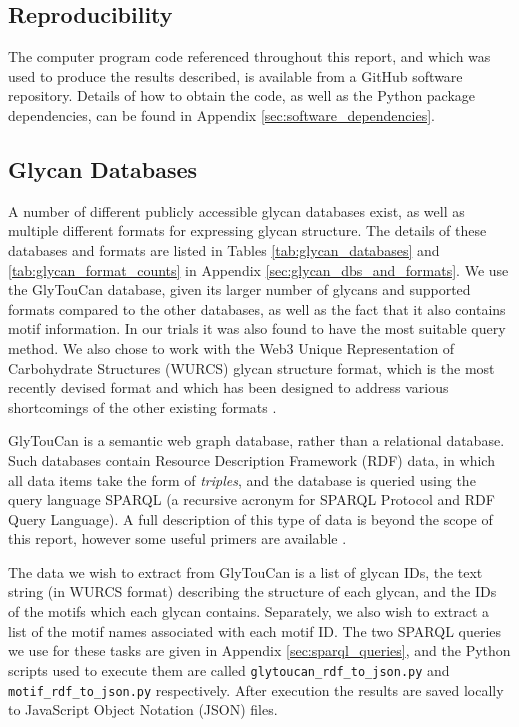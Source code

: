 \documentclass[12pt,a4paper]{article}
\begin{document}
\subsection{Reproducibility}
\label{sec:reproducibility}
The computer program code referenced throughout this report, and which was used to produce the results described, is available from a GitHub software repository. Details of how to obtain the code, as well as the Python package dependencies, can be found in Appendix \ref{sec:software_dependencies}. 

\subsection{Glycan Databases}
\label{sec:glycan_databases}

A number of different publicly accessible glycan databases exist, as well as multiple different formats for expressing glycan structure. The details of these databases and formats are listed in Tables \ref{tab:glycan_databases} and \ref{tab:glycan_format_counts} in Appendix \ref{sec:glycan_dbs_and_formats}. We use the GlyTouCan database, given its larger number of glycans and supported formats compared to the other databases, as well as the fact that it also contains motif information. In our trials it was also found to have the most suitable query method. We also chose to work with the Web3 Unique Representation of Carbohydrate Structures (WURCS) glycan structure format, which is the most recently devised format and which has been designed to address various shortcomings of the other existing formats \citep{matsubara2017wurcs}.

GlyTouCan is a semantic web graph database, rather than a relational database. Such databases contain Resource Description Framework (RDF) data, in which all data items take the form of \emph{triples}, and the database is queried using the query language SPARQL (a recursive acronym for SPARQL Protocol and RDF Query Language). A full description of this type of data is beyond the scope of this report, however some useful primers are available \citep{rdf_primer, sparql_overview}.

The data we wish to extract from GlyTouCan is a list of glycan IDs, the text string (in WURCS format) describing the structure of each glycan, and the IDs of the motifs which each glycan contains. Separately, we also wish to extract a list of the motif names associated with each motif ID. The two SPARQL queries we use for these tasks are given in Appendix \ref{sec:sparql_queries}, and the Python scripts used to execute them are called \texttt{glytoucan\_rdf\_to\_json.py} and \texttt{motif\_rdf\_to\_json.py} respectively. After execution the results are saved locally to JavaScript Object Notation (JSON) files.
\end{document}
